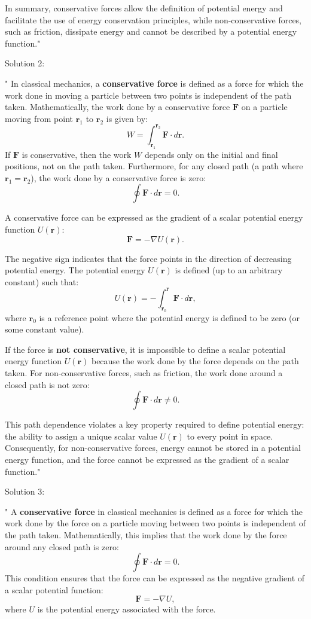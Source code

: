 In summary, conservative forces allow the definition of potential energy and facilitate the use of energy conservation principles, while non-conservative forces, such as friction, dissipate energy and cannot be described by a potential energy function."

Solution 2: 

"
In classical mechanics, a \textbf{conservative force} is defined as a force for which the work done in moving a particle between two points is independent of the path taken. Mathematically, the work done by a conservative force $\mathbf{F}$ on a particle moving from point $\mathbf{r}_1$ to $\mathbf{r}_2$ is given by:
\[
W = \int_{\mathbf{r}_1}^{\mathbf{r}_2} \mathbf{F} \cdot d\mathbf{r}.
\]
If $\mathbf{F}$ is conservative, then the work $W$ depends only on the initial and final positions, not on the path taken. Furthermore, for any closed path (a path where $\mathbf{r}_1 = \mathbf{r}_2$), the work done by a conservative force is zero:
\[
\oint \mathbf{F} \cdot d\mathbf{r} = 0.
\]

A conservative force can be expressed as the gradient of a scalar potential energy function $U(\mathbf{r})$:
\[
\mathbf{F} = -\nabla U(\mathbf{r}).
\]

The negative sign indicates that the force points in the direction of decreasing potential energy. The potential energy $U(\mathbf{r})$ is defined (up to an arbitrary constant) such that:
\[
U(\mathbf{r}) = - \int_{\mathbf{r}_0}^{\mathbf{r}} \mathbf{F} \cdot d\mathbf{r},
\]
where $\mathbf{r}_0$ is a reference point where the potential energy is defined to be zero (or some constant value).

If the force is \textbf{not conservative}, it is impossible to define a scalar potential energy function $U(\mathbf{r})$ because the work done by the force depends on the path taken. For non-conservative forces, such as friction, the work done around a closed path is not zero:
\[
\oint \mathbf{F} \cdot d\mathbf{r} \neq 0.
\]

This path dependence violates a key property required to define potential energy: the ability to assign a unique scalar value $U(\mathbf{r})$ to every point in space. Consequently, for non-conservative forces, energy cannot be stored in a potential energy function, and the force cannot be expressed as the gradient of a scalar function."

Solution 3:

"
A \textbf{conservative force} in classical mechanics is defined as a force for which the work done by the force on a particle moving between two points is independent of the path taken. Mathematically, this implies that the work done by the force around any closed path is zero:
\[
\oint \mathbf{F} \cdot d\mathbf{r} = 0.
\]
This condition ensures that the force can be expressed as the negative gradient of a scalar potential function:
\[
\mathbf{F} = -\nabla U,
\]
where $U$ is the potential energy associated with the force. \\

